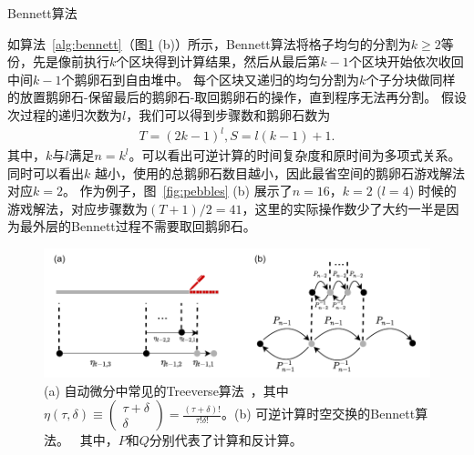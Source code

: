 \documentclass[A4,twoside,UTF8]{ctexart}
\begin{document}
\begin{algorithm}
    \SetAlgoLined
    \DontPrintSemicolon
    \caption{Bennett算法}\label{alg:bennett}
\end{algorithm}
如算法~\ref{alg:bennett}（图\ref{fig:tradeoff} (b)）所示，Bennett算法将格子均匀的分割为$k\geq 2$等份，先是像前执行$k$个区块得到计算结果，然后从最后第$k-1$个区块开始依次收回中间$k-1$个鹅卵石到自由堆中。
每个区块又递归的均匀分割为$k$个子分块做同样的放置鹅卵石-保留最后的鹅卵石-取回鹅卵石的操作，直到程序无法再分割。
假设次过程的递归次数为$l$，我们可以得到步骤数和鹅卵石数为
\begin{align}\label{eq:rev}
    T = (2k-1)^l, S = l(k-1)+1.
\end{align}
其中，$k$与$l$满足$n = k^l$。可以看出可逆计算的时间复杂度和原时间为多项式关系。
同时可以看出$k$ 越小，使用的总鹅卵石数目越小，因此最省空间的鹅卵石游戏解法对应$k=2$。
作为例子，图~\ref{fig:pebbles} (b) 展示了$n=16$，$k=2$ ($l=4$) 时候的游戏解法，对应步骤数为$(T+1)/2 = 41$，这里的实际操作数少了大约一半是因为最外层的Bennett过程不需要取回鹅卵石。

\begin{figure}
    \centerline{\includegraphics[width=0.88\columnwidth,trim={0 0cm 0 0cm},clip]{tradeoff2.pdf}}
    \caption{(a) 自动微分中常见的Treeverse算法~\cite{Griewank1992}，其中$\eta(\tau, \delta) \equiv \left(\begin{matrix} \tau + \delta \\ \delta \end{matrix}\right)=\frac{(\tau+\delta)!}{\tau!\delta!}$。(b) 可逆计算时空交换的Bennett算法。~\cite{Bennett1973,Levine1990} 其中，$P$和$Q$分别代表了计算和反计算。}\label{fig:tradeoff}
\end{figure}
\end{document}

